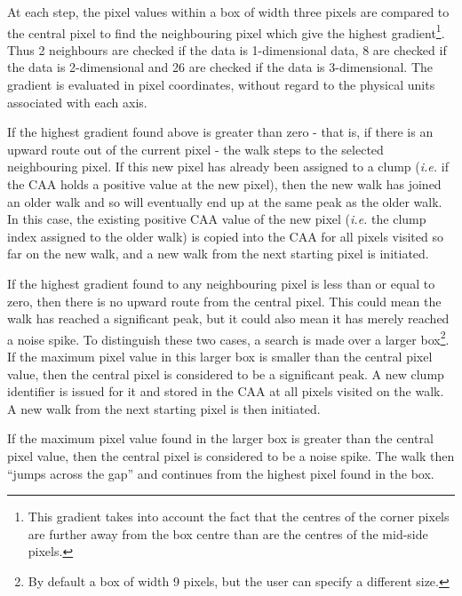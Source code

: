 \documentclass[final,authoryear,5p,times,twocolumn]{elsarticle}
\begin{document}
At each step, the pixel values within a box of width three pixels are compared
to the central pixel to find the neighbouring pixel which give the highest
gradient\footnote{This gradient takes into account the fact that the
centres of the corner pixels are further away from the box centre than
are the centres of the mid-side pixels.}. Thus 2 neighbours are checked if
the data is 1-dimensional data, 8 are checked if the data is 2-dimensional
and 26 are checked if the data is 3-dimensional. The gradient is
evaluated in pixel coordinates, without regard to the physical units
associated with each axis.

If the highest gradient found above is greater than zero - that is, if
there is an upward route out of the current pixel - the walk steps to the
selected neighbouring pixel. If this new pixel has already been assigned
to a clump (\emph{i.e.} if the CAA holds a positive value at the new
pixel), then the new walk has joined an older walk and so will eventually
end up at the same peak as the older walk. In this case, the existing
positive CAA value of the new pixel (\emph{i.e.} the clump index assigned
to the older walk) is copied into the CAA for all pixels visited so far
on the new walk, and a new walk from the next starting pixel is
initiated.

If the highest gradient found to any neighbouring pixel is less than or
equal to zero, then there is no upward route from the central pixel. This
could mean the walk has reached a significant peak, but it could also
mean it has merely reached a noise spike. To distinguish these two cases,
a search is made over a larger box\footnote{By default a box of width 9
pixels, but the user can specify a different size.}. If the maximum pixel
value in this larger box is smaller than the central pixel value, then
the central pixel is considered to be a significant peak. A new clump
identifier is issued for it and stored in the CAA at all pixels visited
on the walk. A new walk from the next starting pixel is then initiated.

If the maximum pixel value found in the larger box is greater than the
central pixel value, then the central pixel is considered to be a noise
spike. The walk then ``jumps across the gap'' and continues from the
highest pixel found in the box.
\end{document}
